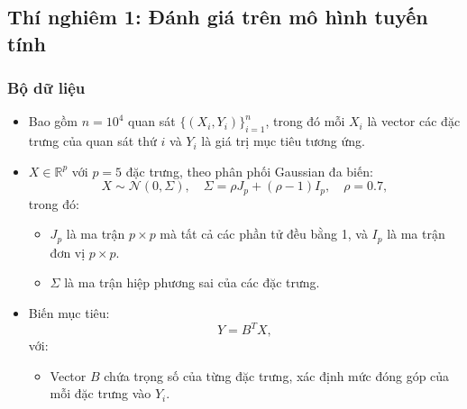\documentclass[12pt, a4paper]{article}
\begin{document}
\subsection{Thí nghiêm 1: Đánh giá trên mô hình tuyến tính}
\subsubsection{Bộ dữ liệu}
        \begin{itemize}[align=parleft, left=4em, labelsep=1em, itemsep=0.5em]
                    \item Bao gồm $n = 10^4$ quan sát $\{(X_i, Y_i)\}_{i=1}^{n}$, trong đó mỗi $X_i$ là vector các đặc trưng của quan sát thứ $i$ và $Y_i$ là giá trị mục tiêu tương ứng.
                    
                    \item $X \in \mathbb{R}^p$ với $p = 5$ đặc trưng, theo phân phối Gaussian đa biến: 
                    \begin{equation*}
                        X \sim \mathcal{N}(0, \Sigma), \quad 
                        \Sigma = \rho J_p + (\rho - 1) I_p, \quad 
                        \rho = 0.7,
                    \end{equation*}
                    trong đó:
                      \begin{itemize}[label=$\circ$, left=1em, labelsep=0.75em, itemsep=0.5em]
                            \item $J_p$ là ma trận $p \times p$ mà tất cả các phần tử đều bằng 1, và $I_p$ là ma trận đơn vị $p \times p$.
        
                            \item $\Sigma$ là ma trận hiệp phương sai của các đặc trưng.
                        
                        \end{itemize}
                
                    \item Biến mục tiêu:
                    \begin{equation*}
                        Y = B^T X,
                    \end{equation*}
                    với:
                    
                      \begin{itemize}[label=$\circ$, left=1em, labelsep=0.75em, itemsep=0.5em]
                        \item Vector $B$ chứa trọng số của từng đặc trưng, xác định mức đóng góp của mỗi đặc trưng vào $Y_i$.
                     \end{itemize} 
        \end{itemize}
\end{document}
